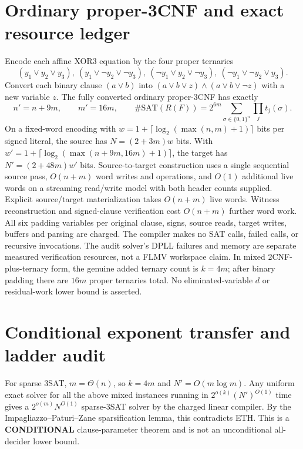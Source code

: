 \documentclass[11pt]{article}
\begin{document}
\section{Ordinary proper-3CNF and exact resource ledger}
Encode each affine XOR3 equation by the four proper ternaries
\[
(y_1\vee y_2\vee y_3),\
(y_1\vee\neg y_2\vee\neg y_3),\
(\neg y_1\vee y_2\vee\neg y_3),\
(\neg y_1\vee\neg y_2\vee y_3).
\]
Convert each binary clause $(a\vee b)$ into
$(a\vee b\vee z)\wedge(a\vee b\vee\neg z)$ with a new variable $z$.
The fully converted ordinary proper-3CNF has exactly
\[
n'=n+9m,\qquad m'=16m,\qquad
\#\mathrm{SAT}(R(F))=
2^{6m}\sum_{\sigma\in\{0,1\}^n}\prod_j t_j(\sigma).
\]
On a fixed-word encoding with $w=1+\lceil\log_2(\max(n,m)+1)\rceil$ bits per signed literal, the source has $N=(2+3m)w$ bits. With $w'=1+\lceil\log_2(\max(n+9m,16m)+1)\rceil$, the target has $N'=(2+48m)w'$ bits. Source-to-target construction uses a single sequential source pass, $O(n+m)$ word writes and operations, and $O(1)$ additional live words on a streaming read/write model with both header counts supplied. Explicit source/target materialization takes $O(n+m)$ live words. Witness reconstruction and signed-clause verification cost $O(n+m)$ further word work. All six padding variables per original clause, signs, source reads, target writes, buffers and parsing are charged. The compiler makes no SAT calls, failed calls, or recursive invocations. The audit solver's DPLL failures and memory are separate measured verification resources, not a FLMV workspace claim. In mixed 2CNF-plus-ternary form, the genuine added ternary count is $k=4m$; after binary padding there are $16m$ proper ternaries total. No eliminated-variable $d$ or residual-work lower bound is asserted.

\section{Conditional exponent transfer and ladder audit}
For sparse 3SAT, $m=\Theta(n)$, so $k=4m$ and $N'=O(m\log m)$. Any uniform exact solver for all the above mixed instances running in $2^{o(k)}(N')^{O(1)}$ time gives a $2^{o(m)}N^{O(1)}$ sparse-3SAT solver by the charged linear compiler. By the Impagliazzo--Paturi--Zane sparsification lemma, this contradicts ETH. This is a \textbf{CONDITIONAL} clause-parameter theorem and is not an unconditional all-decider lower bound.
\end{document}
